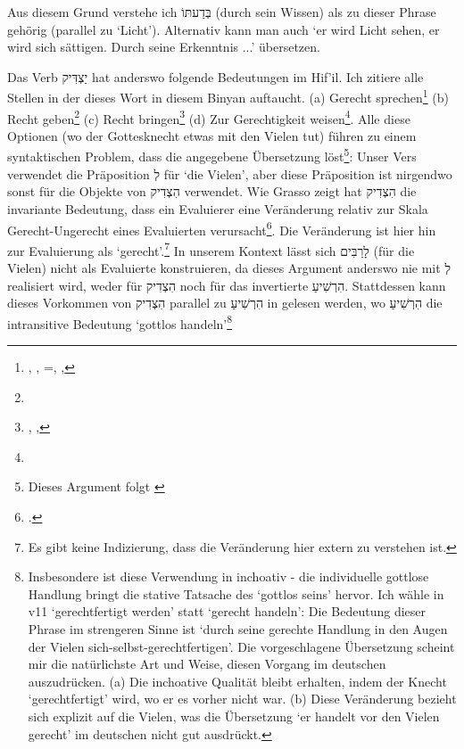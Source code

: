 \begin{description}
		Aus diesem Grund verstehe ich בְּדַעתּוֹ (durch sein Wissen) als zu dieser Phrase gehörig (parallel zu `Licht').
		Alternativ kann man auch `er wird Licht sehen, er wird sich sättigen. Durch seine Erkenntnis ...' übersetzen.
	\item[11 vor den Vielen gerechtfertigt werden] Das Verb יַצְדִּיק hat anderswo folgende Bedeutungen im Hif'il. Ich zitiere alle Stellen in der dieses Wort in diesem Binyan auftaucht.
		(a) Gerecht sprechen\footnote{, , =, , }
		(b) Recht geben\footnote{}
		(c) Recht bringen\footnote{, , }
		(d) Zur Gerechtigkeit weisen\footnote{}.
		Alle diese Optionen (wo der Gottesknecht etwas mit den Vielen tut) führen zu einem syntaktischen Problem, dass die angegebene Übersetzung löst\footnote{Dieses Argument folgt \Cite{hebrew-verbs-of-judgement}}:
		Unser Vers verwendet die Präposition לְ für `die Vielen', aber diese Präposition ist nirgendwo sonst für die Objekte von הִצְדִיק verwendet.
		Wie Grasso zeigt hat הִצְדִיק die invariante Bedeutung, dass ein Evaluierer eine Veränderung relativ zur Skala Gerecht-Ungerecht eines Evaluierten verursacht\Footcite[218f]{hebrew-verbs-of-judgement}.
		Die Veränderung ist hier hin zur Evaluierung als `gerecht'.\footnote{Es gibt keine Indizierung, dass die Veränderung hier extern zu verstehen ist.}
		In unserem Kontext lässt sich לָרַבִּים (für die Vielen) nicht als Evaluierte konstruieren,
		da dieses Argument anderswo nie mit לְ realisiert wird, weder für הִצְדִיק noch für das invertierte הִרְשִׁיעַ.
		Stattdessen kann dieses Vorkommen von הִצְדִיק parallel zu הִרְשִׁיעַ in  gelesen werden, wo הִרְשִׁיעַ die intransitive Bedeutung `gottlos handeln'\footnote{
			Insbesondere ist diese Verwendung in  inchoativ - die individuelle gottlose Handlung bringt die stative Tatsache des `gottlos seins' hervor.
		Ich wähle in v11 `gerechtfertigt werden' statt `gerecht handeln':
		Die Bedeutung dieser Phrase im strengeren Sinne ist `durch seine gerechte Handlung in den Augen der Vielen sich-selbst-gerechtfertigen'.
		Die vorgeschlagene Übersetzung scheint mir die natürlichste Art und Weise, diesen Vorgang im deutschen auszudrücken.
		(a) Die inchoative Qualität bleibt erhalten, indem der Knecht `gerechtfertigt' wird, wo er es vorher nicht war.
		(b) Diese Veränderung bezieht sich explizit auf die Vielen, was die Übersetzung `er handelt vor den Vielen gerecht' im deutschen nicht gut ausdrückt.
}
\end{description}
